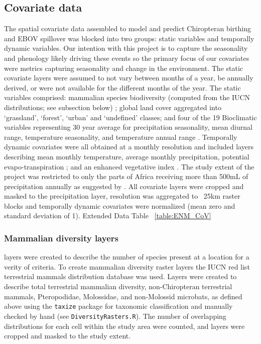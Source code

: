 \documentclass[9pt,twoside,lineno]{pnas-new}
\begin{document}
\subsection*{Covariate data}
\label{CoV}
	The spatial covariate data assembled to model and predict Chiropteran birthing and  EBOV spillover was blocked into two groups: static variables and temporally dynamic variables.
Our intention with this project is to capture the seasonality and phenology likely driving these events so the primary focus of our covariates were metrics capturing seasonality and change in the environment.
The static covariate layers were assumed to not vary between months of a year, be annually derived, or were not available for the different months of the year.
The static variables comprised: mammalian species biodiversity (computed from the IUCN distributions; see subsection below) \cite{IUCN2016TerrestrialData}; global land cover aggregated into `grassland', `forest', `urban' and `undefined' classes\cite{Olivier2012Global2009}; and four of the 19 Bioclimatic variables representing 30 year average for precipitation seasonality, mean diurnal range, temperature seasonality, and temperature annual range \cite{Frick2017WorldclimArease}.
Temporally dynamic covariates were all obtained at a monthly resolution and included layers describing mean monthly temperature, average monthly precipitation, potential evapo-transpiration \cite{Trabucco2009GlobalDatabase}; and an enhanced vegetative index \cite{Huete2002OverviewIndices}.
The study extent of the project was restricted to only the parts of Africa receiving more than 500mL of precipitation annually as suggested by \cite{Schmidt2017SpatiotemporalSpillover}.
All covariate layers were cropped and  masked to the precipitation layer, resolution was aggregated to ~25km raster blocks and temporally dynamic covariates were normalized (mean zero and standard deviation of 1). Extended Data Table ~\ref{table:ENM_CoV}

\subsubsection*{Mammalian diversity layers}
	layers were created to describe the number of species present at a location for a verity of criteria.
To create mammalian diversity raster layers the IUCN red list terrestrial mammals distribution database \cite{IUCN2016TerrestrialData} was used. Layers were created to describe total terrestrial mammalian diversity, non-Chiropteran terrestrial mammals, Pteropodidae, Molossidae, and non-Molossid microbats, as defined above using the \texttt{taxize} package \cite{Chamberlain2013Taxize:R} for taxonomic classification and manually checked by hand (see \texttt{DiversityRasters.R}).
The number of overlapping distributions for each cell within the study area were counted, and layers were cropped and masked to the study extent.
    
\end{document}

